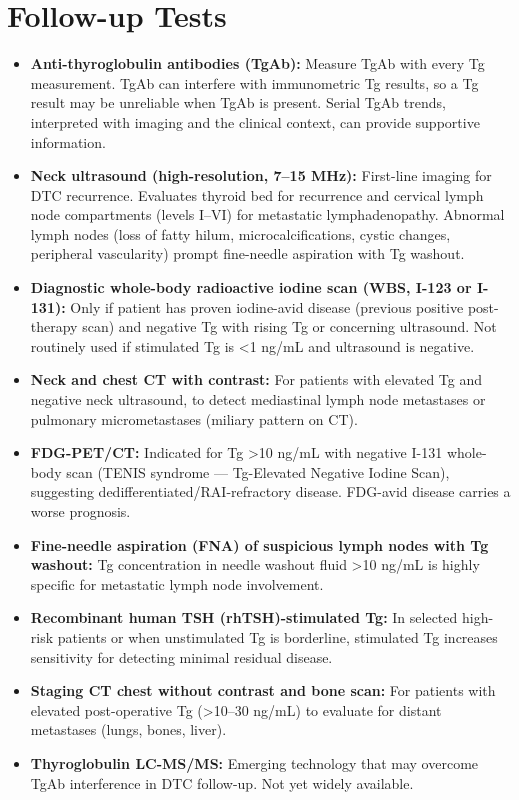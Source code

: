 \section*{Follow-up Tests}
\begin{itemize}
  \item \textbf{Anti-thyroglobulin antibodies (TgAb):} Measure TgAb with every Tg measurement. TgAb can interfere with immunometric Tg results, so a Tg result may be unreliable when TgAb is present. Serial TgAb trends, interpreted with imaging and the clinical context, can provide supportive information.
  \item \textbf{Neck ultrasound (high-resolution, 7--15 MHz):} First-line imaging for DTC recurrence. Evaluates thyroid bed for recurrence and cervical lymph node compartments (levels I--VI) for metastatic lymphadenopathy. Abnormal lymph nodes (loss of fatty hilum, microcalcifications, cystic changes, peripheral vascularity) prompt fine-needle aspiration with Tg washout.
  \item \textbf{Diagnostic whole-body radioactive iodine scan (WBS, I-123 or I-131):} Only if patient has proven iodine-avid disease (previous positive post-therapy scan) and negative Tg with rising Tg or concerning ultrasound. Not routinely used if stimulated Tg is <1 ng/mL and ultrasound is negative.
  \item \textbf{Neck and chest CT with contrast:} For patients with elevated Tg and negative neck ultrasound, to detect mediastinal lymph node metastases or pulmonary micrometastases (miliary pattern on CT).
  \item \textbf{FDG-PET/CT:} Indicated for Tg >10 ng/mL with negative I-131 whole-body scan (TENIS syndrome --- Tg-Elevated Negative Iodine Scan), suggesting dedifferentiated/RAI-refractory disease. FDG-avid disease carries a worse prognosis.
  \item \textbf{Fine-needle aspiration (FNA) of suspicious lymph nodes with Tg washout:} Tg concentration in needle washout fluid >10 ng/mL is highly specific for metastatic lymph node involvement.
  \item \textbf{Recombinant human TSH (rhTSH)-stimulated Tg:} In selected high-risk patients or when unstimulated Tg is borderline, stimulated Tg increases sensitivity for detecting minimal residual disease.
  \item \textbf{Staging CT chest without contrast and bone scan:} For patients with elevated post-operative Tg (>10--30 ng/mL) to evaluate for distant metastases (lungs, bones, liver).
  \item \textbf{Thyroglobulin LC-MS/MS:} Emerging technology that may overcome TgAb interference in DTC follow-up. Not yet widely available.
\end{itemize}

